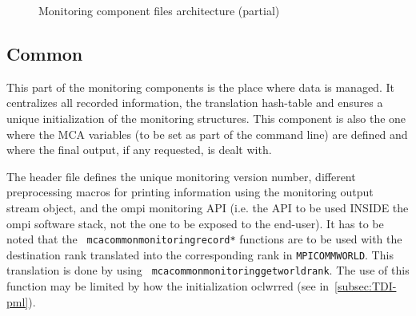 \begin{figure}
\caption{Monitoring component files architecture (partial)}
\label{fig:tree}
\end{figure}

\subsection{Common}
\label{subsec:TDI-common}
This part of the monitoring components is the place where data is
managed. It centralizes all recorded information, the translation
hash-table and ensures a unique initialization of the monitoring
structures. This component is also the one where the MCA variables (to
be set as part of the command line) are defined and where the final
output, if any requested, is dealt with.

The header file defines the unique monitoring version number,
different preprocessing macros for printing information using the
monitoring output stream object, and the ompi monitoring API (i.e. the
API to be used INSIDE the ompi software stack, not the one to be
exposed to the end-user). It has to be noted that the {\tt
  mca\brkunds{}common\brkunds{}monitoring\brkunds{}record\brkunds{}*}
functions are to be used with the destination rank translated into the
corresponding rank in {\tt MPI\brkunds{}COMM\brkunds{}WORLD}. This
translation is done by using {\tt
  mca\brkunds{}common\brkunds{}monitoring\brkunds{}get\brkunds{}world\brkunds{}rank}. The
use of this function may be limited by how the initialization oclwrred
(see in~\ref{subsec:TDI-pml}).

